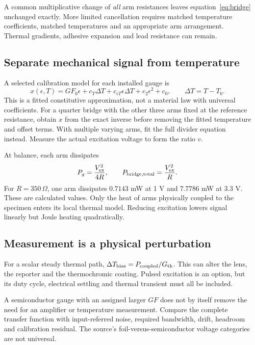 \documentclass[10pt,a4paper]{article}
\numberwithin{equation}{section}
\begin{document}
A common multiplicative change of \emph{all} arm resistances leaves equation~\eqref{eq:bridge} unchanged exactly. More limited cancellation requires matched temperature coefficients, matched temperatures and an appropriate arm arrangement. Thermal gradients, adhesive expansion and lead resistance can remain.

\subsection*{Separate mechanical signal from temperature}
A selected calibration model for each installed gauge is
\begin{equation}
x(\epsilon,T)=GF_0\epsilon+c_T\Delta T+c_{\epsilon T}\epsilon\Delta T
+c_2\epsilon^2+c_0,\qquad \Delta T=T-T_0.
\label{eq:gaugecal}
\end{equation}
This is a fitted constitutive approximation, not a material law with universal coefficients. For a quarter bridge with the other three arms fixed at the reference resistance, obtain $x$ from the exact inverse before removing the fitted temperature and offset terms. With multiple varying arms, fit the full divider equation instead. Measure the actual excitation voltage to form the ratio $v$.

At balance, each arm dissipates
\begin{equation}
P_g=\frac{V_{\rm ex}^2}{4R},\qquad
P_{\rm bridge,total}=\frac{V_{\rm ex}^2}{R}.
\end{equation}
For $R=350\,\Omega$, one arm dissipates $0.7143$ mW at 1 V and $7.7786$ mW at 3.3 V. These are calculated values. Only the heat of arms physically coupled to the specimen enters its local thermal model. Reducing excitation lowers signal linearly but Joule heating quadratically.

\subsection*{Measurement is a physical perturbation}
For a scalar steady thermal path, $\Delta T_{\rm bias}=P_{\rm coupled}/G_{\rm th}$. This can alter the lens, the reporter and the thermochromic coating. Pulsed excitation is an option, but its duty cycle, electrical settling and thermal transient must all be included.

A semiconductor gauge with an assigned larger $GF$ does not by itself remove the need for an amplifier or temperature measurement. Compare the complete transfer function with input-referred noise, required bandwidth, drift, headroom and calibration residual. The source's foil-versus-semiconductor voltage categories are not universal.
\end{document}
